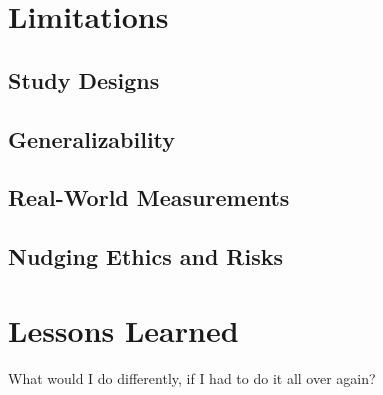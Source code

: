 



\section{Limitations}

\subsection{Study Designs}

\subsection{Generalizability}

\subsection{Real-World Measurements}

\subsection{Nudging Ethics and Risks}




\section{Lessons Learned}
What would I do differently, if I had to do it all over again?



